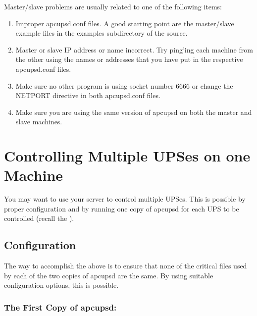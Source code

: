 {{{{{{Master/slave problems are usually related to one of the following items:  

\begin{enumerate}
\item Improper apcupsd.conf files. A good starting point are the master/slave
   example files in the examples subdirectory of the source.  
\item Master or slave IP address or name incorrect. Try ping'ing each machine
   from the other using the names or addresses that you have put in the
   respective apcupsd.conf files.  
\item Make sure no other program is using socket number 6666 or change the
   NETPORT directive in both apcupsd.conf files.  
\item Make sure you are using the same version of apcupsd on both the master
   and slave machines.  
   \end{enumerate}

\label{Controlling-Multiple-UPSes-on-one-Machine}

\section*{Controlling Multiple UPSes on one Machine}

You may want to use your server to control multiple UPSes. This is possible by
proper configuration and by running one copy of apcupsd for each UPS to be
controlled (recall the 
). 

\label{Configuration}

\subsection*{Configuration}

The way to accomplish the above is to ensure that none of the critical files
used by each of the two copies of apcupsd are the same. By using suitable
configuration options, this is possible. 

\label{The-First-Copy-of-apcupsd}

\subsubsection*{The First Copy of apcupsd:}

}}}}}}
